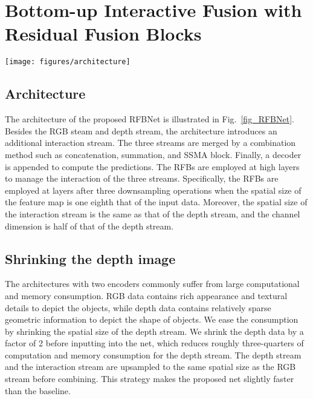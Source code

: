 \documentclass[letterpaper, 10 pt, conference]{ieeeconf}
\begin{document}
	\section{Bottom-up Interactive Fusion with Residual Fusion Blocks}
	\begin{figure*}[!tb]
		\centering
		\texttt{[image: figures/architecture]}
		\caption{The architecture of the RFBNet. The three bottom-up streams are highlighted by different colors: RGB stream (blue), depth stream (green), and interaction stream (orange). The RFB manages the interaction of the three streams. \textcircled{\tiny F} denotes the combination method.}
		\label{fig_RFBNet}
	\end{figure*}
	
	\subsection{Architecture}
	The architecture of the proposed RFBNet is illustrated in Fig.~\ref{fig_RFBNet}. Besides the RGB steam and depth stream, the architecture introduces an additional interaction stream. The three streams are merged by a combination method such as concatenation, summation, and SSMA block\cite{valada2019self}. Finally, a decoder is appended to compute the predictions. The RFBs are employed at high layers to manage the interaction of the three streams. Specifically, the RFBs are employed at layers after three downsampling operations when the spatial size of the feature map is one eighth that of the input data. Moreover, the spatial size of the interaction stream is the same as that of the depth stream, and the channel dimension is half of that of the depth stream.
	
	\subsection{Shrinking the depth image}
	The architectures with two encoders commonly suffer from large computational and memory consumption. RGB data contains rich appearance and textural details to depict the objects, while depth data contains relatively sparse geometric information to depict the shape of objects. We ease the consumption by shrinking the spatial size of the depth stream. We shrink the depth data by a factor of 2 before inputting into the net, which reduces roughly three-quarters of computation and memory consumption for the depth stream. The depth stream and the interaction stream are upsampled to the same spatial size as the RGB stream before combining. This strategy makes the proposed net slightly faster than the baseline.
	
\end{document}
